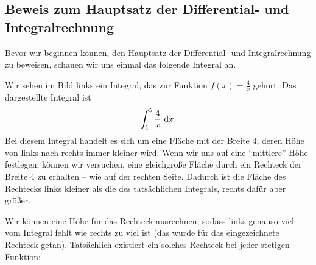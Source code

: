 \documentclass[../../main.tex]{subfiles}
\begin{document}
\subsection*{Beweis zum Hauptsatz der Differential- und Integralrechnung}
\label{hdi-beweis}
Bevor wir beginnen können, den Hauptsatz der Differential- und Integralrechnung zu beweisen, schauen wir uns einmal
das folgende Integral an.
\begin{center}
    \begin{multicols}{2}

    \end{multicols}
\end{center}

Wir sehen im Bild links ein Integral, das zur Funktion $f(x)=\frac{4}{x}$ gehört. Das dargestellte Integral ist
\[\int_1^5\frac{4}{x}\mathop{}\mathrm{d} x.\]
Bei diesem Integral handelt es sich um eine Fläche mit der Breite 4, deren Höhe von links nach rechts immer kleiner wird.
Wenn wir uns auf eine \enquote{mittlere} Höhe festlegen, können wir versuchen, eine gleichgroße Fläche durch ein Rechteck
der Breite 4 zu erhalten -- wie auf der rechten Seite. Dadurch ist die Fläche des Rechtecks links kleiner als die
des tatsächlichen Integrals, rechts dafür aber größer. 

Wir können eine Höhe für das Rechteck ausrechnen, sodass
links genauso viel vom Integral fehlt wie rechts zu viel ist (das wurde für das eingezeichnete Rechteck getan).
Tatsächlich existiert ein solches Rechteck bei jeder stetigen Funktion:
\end{document}
